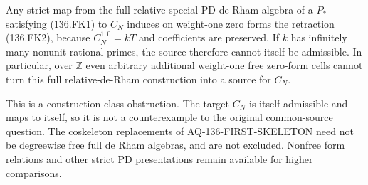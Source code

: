 Any strict map from the full relative special-PD de Rham
algebra of a $P_*$ satisfying (136.FK1) to $C_N$ induces
on weight-one zero forms the retraction (136.FK2), because
$C_N^{1,0}=\underline{kT}$ and coefficients are preserved.
If $k$ has infinitely many nonunit rational primes, the
source therefore cannot itself be admissible.
In particular, over $\mathbb Z$ even arbitrary additional
weight-one free zero-form cells cannot turn this full
relative-de-Rham construction into a source for $C_N$.

This is a construction-class obstruction. The target
$C_N$ is itself admissible and maps to itself, so it is
not a counterexample to the original common-source question.
The coskeleton replacements of AQ-136-FIRST-SKELETON need
not be degreewise free full de Rham algebras, and are not
excluded. Nonfree form relations and other strict PD
presentations remain available for higher comparisons.
